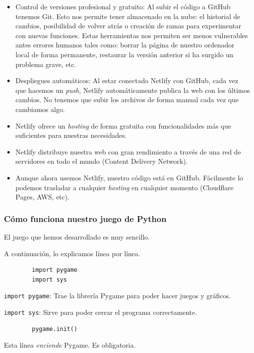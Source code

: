 \documentclass[11.5pt]{article}
\begin{document}
	\begin{itemize}
		\item Control de versiones profesional y gratuito: Al subir el código a GitHub tenemos Git. Esto nos permite tener almacenado en la nube: el historial de cambios, posibilidad de volver atrás o creación de ramas para experimentar con nuevas funciones. Estas herramientas nos permiten ser menos vulnerables antes errores humanos tales como: borrar la página de nuestro ordenador local de forma permanente, restaurar la versión anterior si ha surgido un problema grave, etc.
		\item Despliegues automáticos: Al estar conectado Netlify con GitHub, cada vez que hacemos un \textit{push}, Netlify automáticamente publica la web con los últimos cambios. No tenemos que subir los archivos de forma manual cada vez que cambiamos algo.
		\item Netlify ofrece un \textit{hosting} de forma gratuita con funcionalidades más que suficientes para nuestras necesidades.
		\item Netlify distribuye nuestra web con gran rendimiento a través de una red de servidores en todo el mundo (Content Delivery Network). 
		\item Aunque ahora usemos Netlify, nuestro código está en GitHub. Fácilmente lo podemos trasladar a cualquier \textit{hosting} en cualquier momento (Cloudflare Pages, AWS, etc).
	\end{itemize}
	
	\subsubsection{Cómo funciona nuestro juego de Python}
	
	El juego que hemos desarrollado es muy sencillo.
	
	A continuación, lo explicamos línea por línea.
	
	\begin{verbatim}
		import pygame
		import sys
	\end{verbatim}
	
	\verb|import pygame|: Trae la librería Pygame para poder hacer juegos y gráficos.
	
	\verb|import sys|: Sirve para poder cerrar el programa correctamente.
	
	\begin{verbatim}
		pygame.init()
	\end{verbatim}
	
	Esta línea \textit{enciende} Pygame. Es obligatoria. 
	
\end{document}
